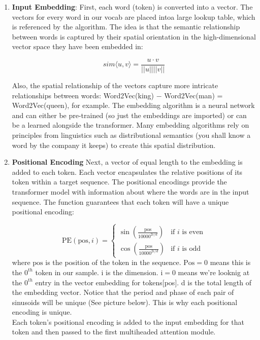 \documentclass[12pt]{article}
\begin{document}
\begin{enumerate}
\item \textbf{Input Embedding}: 
First, each word (token) is converted into a vector. The vectors for every word in our vocab are placed intoa large lookup table, which is referenced by the algorithm. The idea is that the semantic relationship between words is captured by their spatial orientation in the high-dimensional vector space they have been embedded in: 

\[sim \langle u, v \rangle = \frac{u \cdot v }{||u|| ||v||}\]

Also, the spatial relationship of the vectors capture more intricate relationships between words: Word2Vec(king) \(-\) Word2Vec(man) = Word2Vec(queen), for example. The embedding algorithm is a neural network and can either be pre-trained (so just the embeddings are imported) or can be a learned alongside the transformer. Many embedding algorithms rely on principles from linguistics such as distributional semantics (you shall know a word by the company it keeps) to create this spatial distribution.

\item \textbf{Positional Encoding} Next, a vector of equal length to the embedding is added to each token. Each vector encapsulates the relative positions of its token within a target sequence. The positional encodings provide the transformer model with information about where the words are in the input sequence. The function guarantees that each token will have a unique positional encoding: 

\[
\text{PE}(\text{pos}, i) = 
\begin{cases} 
\sin\left(\frac{\text{pos}}{10000^{2i/d}}\right) & \text{if } i \text{ is even} \\
\cos\left(\frac{\text{pos}}{10000^{2i/d}}\right) & \text{if } i \text{ is odd}
\end{cases}
\]
where \(\text{pos}\) is the position of the token in the sequence. \(\text{Pos}=0\) means this is the \(0^{th}\) token in our sample. i is the dimension.  \(\text{i}=0\) means we're looknig at the \(0^{th}\) entry in the vector embedding for tokens[pos]. d is the total length of the embedding vector. 
Notice that the period and phase of each pair of sinusoids will be unique (See picture below). This is why each positional encoding is unique. \\

Each token's positional encoding is added to the input embedding for that token and then passed to the first multiheaded attention module.



\end{enumerate}
\end{document}
